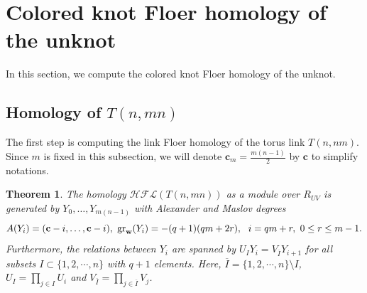 \documentclass[10pt,a4paper]{amsart}
\newtheorem{theorem}{Theorem}[section]
\newcommand{\cHFL}{\mathcal{H\!F\! L}}
\newcommand{\w}{\mathbf{w}}
\def\gr{\textup{gr}}
\def\w{{\bf{w}}}
\newcommand{\cc}{\mathbf{c}}
\begin{document}
\section{Colored knot Floer homology of the unknot}

In this section, we compute the colored knot Floer homology of the unknot.  %


\subsection{Homology of $T(n,mn)$} The first step is computing the link Floer homology of the torus link $T(n,nm)$. Since $m$ is fixed in this subsection, we will denote $\cc_m=\frac{m(n-1)}{2}$ by $\cc$ to simplify notations. 

\begin{theorem}
\label{thm: Tnm}
The homology $\cHFL(T(n,mn))$ as a module over $R_{UV}$ is generated by $Y_0,\ldots,Y_{m(n-1)}$ with Alexander and Maslov degrees 
$$
A(Y_i)=(\cc-i,\ldots,\cc-i),\ \gr_{\w}(Y_i)=-(q+1)(qm+2r),\ \ i=qm+r,\ 0\le r\le m-1.
$$
Furthermore, the relations between $Y_i$ are spanned by $U_IY_i=V_{\overline{I}}Y_{i+1}$ for all subsets $I\subset\{1,2,\cdots,n\}$ with $q+1$ elements. Here, $\overline{I}=\{1,2,\cdots,n\}\setminus I$, $U_I=\prod_{j\in I}U_i$ and $V_{\overline{I}}=\prod_{j\in \overline{I}}V_j$.
\end{theorem}





\end{document}
